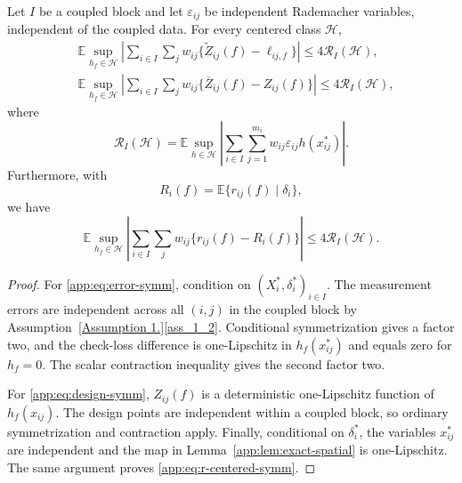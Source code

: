 \documentclass[twoside,11pt]{article}
\newenvironment{revision}{\color{revisionred}}{}
\begin{document}
\begin{revision}
\begin{lemma}
\label{app:lem:pointwise-symm}
Let $I$ be a coupled block and let $\varepsilon_{ij}$ be independent
Rademacher variables, independent of the coupled data.  For every centered
class $\mathcal H$,
\begin{align}
 &\mathbb E\sup_{h_f\in\mathcal H}
 \left|\sum_{i\in I}\sum_jw_{ij}
 \{\widetilde Z_{ij}(f)-\ell_{ij,f}\}\right|
 \le 4\mathcal R_I(\mathcal H),                                \label{app:eq:error-symm}\\
 &\mathbb E\sup_{h_f\in\mathcal H}
 \left|\sum_{i\in I}\sum_jw_{ij}
 \{\overline Z_{ij}(f)-Z_{ij}(f)\}\right|
 \le 4\mathcal R_I(\mathcal H),                                \label{app:eq:design-symm}
\end{align}
where
\begin{equation}
 \mathcal R_I(\mathcal H)=
 \mathbb E\sup_{h\in\mathcal H}
 \left|\sum_{i\in I}\sum_{j=1}^{m_i}w_{ij}\varepsilon_{ij}h(x_{ij}^*)\right|.
                                                                    \label{app:eq:RI}
\end{equation}
Furthermore, with
\begin{equation}
 R_i(f)=\mathbb E\{r_{ij}(f)\mid\delta_i\},                    \label{app:eq:Ri}
\end{equation}
we have
\begin{equation}
 \mathbb E\sup_{h_f\in\mathcal H}
 \left|\sum_{i\in I}\sum_jw_{ij}\{r_{ij}(f)-R_i(f)\}\right|
 \le4\mathcal R_I(\mathcal H).                                 \label{app:eq:r-centered-symm}
\end{equation}
\end{lemma}

\begin{proof}
For \eqref{app:eq:error-symm}, condition on $(X_i^*,\delta_i^*)_{i\in I}$.
The measurement errors are independent across all $(i,j)$ in the coupled
block by Assumption~\ref{Assumption 1.}\ref{ass_1_2}.  Conditional
symmetrization gives a factor two, and the check-loss difference is
one-Lipschitz in $h_f(x_{ij}^*)$ and equals zero for $h_f=0$.  The scalar
contraction inequality gives the second factor two.

For \eqref{app:eq:design-symm}, $Z_{ij}(f)$ is a deterministic one-Lipschitz
function of $h_f(x_{ij})$.  The design points are independent within a coupled
block, so ordinary symmetrization and contraction apply.  Finally, conditional
on $\delta_i^*$, the variables $x_{ij}^*$ are independent and the map in
Lemma~\ref{app:lem:exact-spatial} is one-Lipschitz.  The same argument proves
\eqref{app:eq:r-centered-symm}.
\end{proof}


\end{revision}
\end{document}
